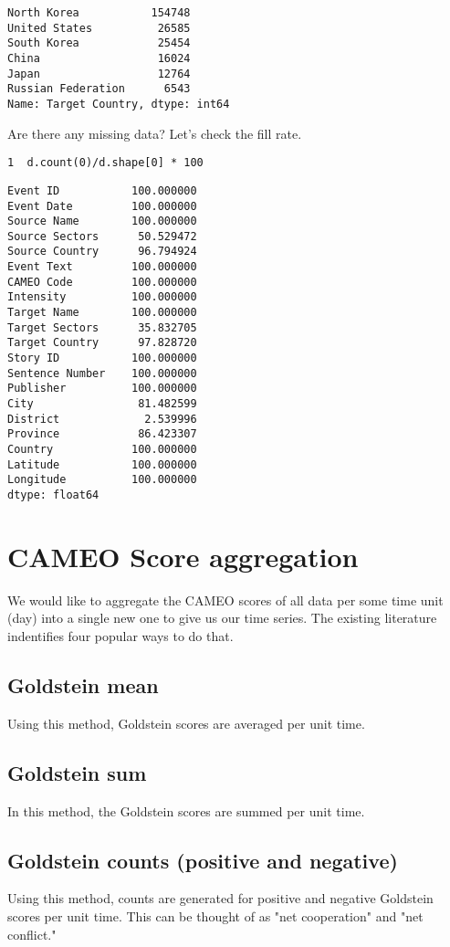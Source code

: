 \documentclass[11pt]{article}
\begin{document}
\begin{verbatim}
North Korea           154748
United States          26585
South Korea            25454
China                  16024
Japan                  12764
Russian Federation      6543
Name: Target Country, dtype: int64
\end{verbatim}

Are there any missing data? Let's check the fill rate.

\begin{verbatim}
1  d.count(0)/d.shape[0] * 100
\end{verbatim}

\begin{verbatim}
Event ID           100.000000
Event Date         100.000000
Source Name        100.000000
Source Sectors      50.529472
Source Country      96.794924
Event Text         100.000000
CAMEO Code         100.000000
Intensity          100.000000
Target Name        100.000000
Target Sectors      35.832705
Target Country      97.828720
Story ID           100.000000
Sentence Number    100.000000
Publisher          100.000000
City                81.482599
District             2.539996
Province            86.423307
Country            100.000000
Latitude           100.000000
Longitude          100.000000
dtype: float64
\end{verbatim}

\section{CAMEO Score aggregation}
\label{sec-3}
  We would like to aggregate the CAMEO scores of all data per some time unit (day) into a single 
new one to give us our time series. The existing literature indentifies four popular ways to do that.
\subsection{Goldstein mean}
\label{sec-3-1}
Using this method, Goldstein scores are averaged per unit time.
\subsection{Goldstein sum}
\label{sec-3-2}
In this method, the Goldstein scores are summed per unit time.
\subsection{Goldstein counts (positive and negative)}
\label{sec-3-3}
   Using this method, counts are generated for positive and negative Goldstein scores per unit time. 
This can be thought of as "net cooperation" and "net conflict."
\end{document}
